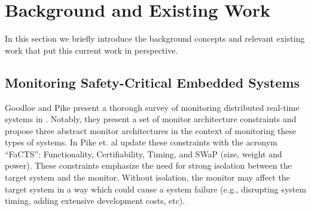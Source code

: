 
\section{Background and Existing Work}
In this section we briefly introduce the background concepts and relevant existing work that put this current work in perspective.  
\subsection{Monitoring Safety-Critical Embedded Systems}
\label{sec:bg:sc_monitor}
Goodloe and Pike present a thorough survey of monitoring distributed real-time systems in \cite{Goodloe2010}. Notably, they present a set of monitor architecture constraints and propose three abstract monitor architectures in the context of monitoring these types of systems.
%
In \cite{Pike2011} Pike et. al update these constraints with the acronym ``FaCTS'': Functionality, Certifiability, Timing, and SWaP (size, weight and power). 
These constraints emphasize the need for strong isolation between the target system and the monitor. Without isolation, the monitor may affect the target system in a way which could cause a system failure (e.g., disrupting system timing, adding extensive development costs, etc).



